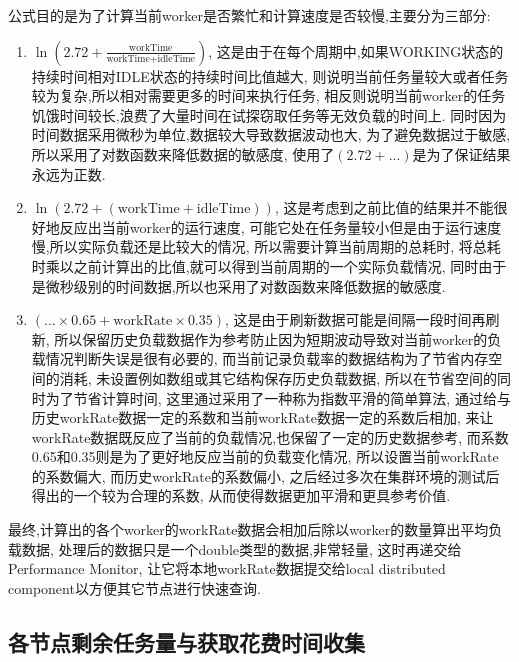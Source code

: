 \documentclass{mproj}
\begin{document}
公式目的是为了计算当前worker是否繁忙和计算速度是否较慢,主要分为三部分:
\begin{enumerate}
    \item $\ln\left( 2.72 + \frac{\text{workTime}}{\text{workTime} + \text{idleTime}} \right)$,
          这是由于在每个周期中,如果WORKING状态的持续时间相对IDLE状态的持续时间比值越大,
          则说明当前任务量较大或者任务较为复杂,所以相对需要更多的时间来执行任务,
          相反则说明当前worker的任务饥饿时间较长,浪费了大量时间在试探窃取任务等无效负载的时间上.
          同时因为时间数据采用微秒为单位,数据较大导致数据波动也大,
          为了避免数据过于敏感,所以采用了对数函数来降低数据的敏感度,
          使用了$(2.72+...)$是为了保证结果永远为正数.

    \item $\ln\left( 2.72 + (\text{workTime} + \text{idleTime}) \right)$,
          这是考虑到之前比值的结果并不能很好地反应出当前worker的运行速度,
          可能它处在任务量较小但是由于运行速度慢,所以实际负载还是比较大的情况,
          所以需要计算当前周期的总耗时,
          将总耗时乘以之前计算出的比值,就可以得到当前周期的一个实际负载情况,
          同时由于是微秒级别的时间数据,所以也采用了对数函数来降低数据的敏感度.

    \item $(... \times 0.65 +\text{workRate} \times 0.35)$,
          这是由于刷新数据可能是间隔一段时间再刷新,
          所以保留历史负载数据作为参考防止因为短期波动导致对当前worker的负载情况判断失误是很有必要的,
          而当前记录负载率的数据结构为了节省内存空间的消耗,
          未设置例如数组或其它结构保存历史负载数据,
          所以在节省空间的同时为了节省计算时间,
          这里通过采用了一种称为指数平滑\cite{GARDNER2006637}的简单算法,
          通过给与历史workRate数据一定的系数和当前workRate数据一定的系数后相加,
          来让workRate数据既反应了当前的负载情况,也保留了一定的历史数据参考,
          而系数0.65和0.35则是为了更好地反应当前的负载变化情况,
          所以设置当前workRate的系数偏大,
          而历史workRate的系数偏小,
          之后经过多次在集群环境的测试后得出的一个较为合理的系数,
          从而使得数据更加平滑和更具参考价值.
\end{enumerate}

最终,计算出的各个worker的workRate数据会相加后除以worker的数量算出平均负载数据,
处理后的数据只是一个double类型的数据,非常轻量,
这时再递交给Performance Monitor,
让它将本地workRate数据提交给local distributed component以方便其它节点进行快速查询.

\subsection{各节点剩余任务量与获取花费时间收集}
\end{document}
